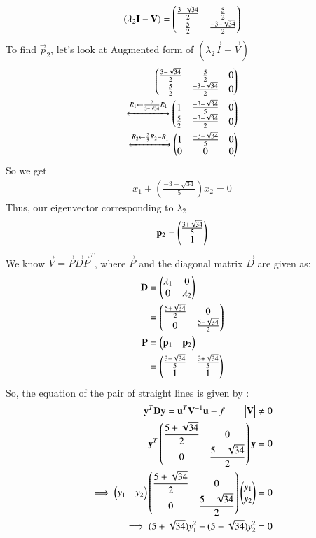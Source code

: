 \begin{align}
    (\lambda_2\mathbf{I}-\mathbf{V}) = \begin{pmatrix}\frac{3-\sqrt{34}}{2} & \frac{5}{2} \\ \frac{5}{2} & \frac{-3 -\sqrt{34}}{2}\end{pmatrix}
\end{align}
To find $\vec{p}_2$, let's look at Augmented form of $(\lambda_2\vec{I}-\vec{V})$
\begin{align}
    \begin{pmatrix}\frac{3-\sqrt{34}}{2} & \frac{5}{2} & 0 \\ \frac{5}{2} & \frac{-3 -\sqrt{34}}{2} & 0\end{pmatrix}\\\xleftrightarrow{R_1 \leftarrow \frac{2}{3-\sqrt{34}}R_1}\begin{pmatrix}1 & \frac{-3-\sqrt{34}}{5} & 0 \\ \frac{5}{2} & \frac{-3 -\sqrt{34}}{2} & 0\end{pmatrix}\\\xleftrightarrow{R_2\leftarrow \frac{2}{5}R_2 - R_1}\begin{pmatrix}1 & \frac{-3-\sqrt{34}}{5} & 0 \\ 0&0&0\end{pmatrix}
\end{align}
So we get
\begin{align}
    x_1 + \left(\frac{-3-\sqrt{34}}{5}\right) x_2 = 0
\end{align}
Thus, our eigenvector corresponding to $\lambda_2$
\begin{align}
    \mathbf{p}_2 = \begin{pmatrix}\frac{3+\sqrt{34}}{5} \\ 1\end{pmatrix}
\end{align}
We know $\vec{V} = \vec{P}\vec{D}\vec{P}^{T}$, where $\vec{P}$ and the diagonal matrix $\vec{D}$ are given as:
\begin{align}
    \mathbf{D} & = \begin{pmatrix}\lambda_1 & 0 \\ 0 & \lambda_2\end{pmatrix}\\ & = \begin{pmatrix}\frac{5+\sqrt{34}}{2} & 0\\ 0 & \frac{5-\sqrt{34}}{2}\end{pmatrix}\label{eq:solutions/13/2/eq:DVal}\\
    \mathbf{P} & = \begin{pmatrix}\mathbf{p}_1 & \mathbf{p}_2\end{pmatrix}\\&= \begin{pmatrix}\frac{3-\sqrt{34}}{5} & \frac{3+\sqrt{34}}{5}\\ 1 & 1\end{pmatrix}\label{eq:solutions/13/2/eq:PVal}
\end{align}
So, the equation of the pair of straight lines is given by :
\begin{align}
    \mathbf{y}^T\mathbf{D}\mathbf{y} = \mathbf{u}^T\mathbf{V}^{-1}\mathbf{u}-f\qquad\text{$\begin{vmatrix}\mathbf{V}\end{vmatrix}\neq0$}\\
    \mathbf{y}^T\begin{pmatrix}\dfrac{5+\sqrt{34}}{2} & 0\\ 0 & \dfrac{5-\sqrt{34}}{2}\end{pmatrix}\mathbf{y} =0\\
    \implies \begin{pmatrix}y_1 & y_2\end{pmatrix}\begin{pmatrix}\dfrac{5+\sqrt{34}}{2} & 0\\ 0 & \dfrac{5-\sqrt{34}}{2}\end{pmatrix}\begin{pmatrix}y_1 \\ y_2\end{pmatrix} = 0\\
    \implies (5+\sqrt{34})y_1^2 + (5-\sqrt{34})y_2^2 = 0
\end{align}
